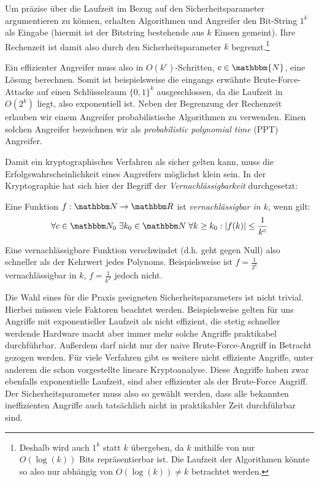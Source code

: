 Um präzise über die Laufzeit im Bezug auf den Sicherheitsparameter argumentieren zu können, erhalten Algorithmen und Angreifer den Bit-String $1^k$ als Eingabe (hiermit ist der Bitstring bestehende aus $k$ Einsen gemeint). Ihre Rechenzeit ist damit also durch den Sicherheitsparameter $k$ begrenzt.\footnote{Deshalb wird auch $1^k$ statt $k$ übergeben, da $k$ mithilfe von nur $O(\log(k))$ Bits repräsentierbar ist. Die Laufzeit der Algorithmen könnte so also nur abhängig von $O(\log(k)) \neq k$ betrachtet werden.} 

Ein effizienter Angreifer muss also in $O(k^c)$-Schritten, $c \in \mathbbm{N}$, eine Lösung berechnen. Somit ist beispielsweise die eingangs erwähnte Brute-Force-Attacke auf einen Schlüsselraum $\{0, 1\}^{k}$ ausgeschlossen, da die Laufzeit in $O(2^{k})$ liegt, also exponentiell ist.
Neben der Begrenzung der Rechenzeit erlauben wir einem Angreifer probabilistische Algorithmen zu verwenden. Einen solchen Angreifer bezeichnen wir als \emph{probabilistic polynomial time} (PPT) Angreifer.

Damit ein kryptographisches Verfahren als sicher gelten kann, muss die Erfolgswahrscheinlichkeit eines Angreifers möglichst \glqq klein\grqq{} sein. In der Kryptographie hat sich hier der Begriff der \emph{Vernachlässigbarkeit} durchgesetzt:
\begin{definition}[Vernachlässigbarkeit]\label{def:negl}
	Eine Funktion $f: \N \to \R$ ist \emph{vernachlässigbar in $k$}, wenn gilt:
	\begin{align*}
	\forall c \in \N_0 \; \exists k_0 \in \N \; \forall k \geq k_0 : \vert f(k) \vert \leq \frac{1}{k^c} 
	\end{align*}
\end{definition}
Eine vernachlässigbare Funktion \glqq verschwindet\grqq{} (d.h. geht gegen Null) also schneller als der Kehrwert jedes Polynoms. Beispielsweise ist $f = \frac{1}{2^k}$ vernachlässigbar in $k$, $f = \frac{1}{k^2}$ jedoch nicht.

Die Wahl eines für die Praxis geeigneten Sicherheitsparameters ist nicht trivial. Hierbei müssen viele Faktoren beachtet werden. Beispielsweise gelten für uns Angriffe mit exponentieller Laufzeit als nicht effizient, die stetig schneller werdende Hardware macht aber immer mehr solche Angriffe praktikabel durchführbar.
Außerdem darf nicht nur der naive Brute-Force-Angriff in Betracht gezogen werden. Für viele Verfahren gibt es weitere nicht effiziente Angriffe, unter anderem die schon vorgestellte lineare Kryptoanalyse. Diese Angriffe haben zwar ebenfalls exponentielle Laufzeit, sind aber effizienter als der Brute-Force Angriff. Der Sicherheitsparameter muss also so gewählt werden, dass alle bekannten ineffizienten Angriffe auch tatsächlich nicht in praktikabler Zeit durchführbar sind. 


